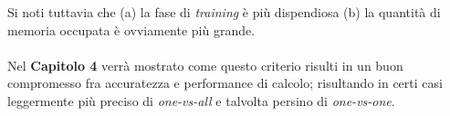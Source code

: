 Si noti tuttavia che (a) la fase di \textit{training} è più dispendiosa (b) la quantità di memoria occupata è ovviamente più grande.

\paragraph{}
Nel \textbf{Capitolo 4} verrà mostrato come questo criterio risulti in un buon compromesso fra accuratezza e performance di calcolo; risultando in certi casi leggermente più preciso di \textit{one-vs-all} e talvolta persino di \textit{one-vs-one}. 

%